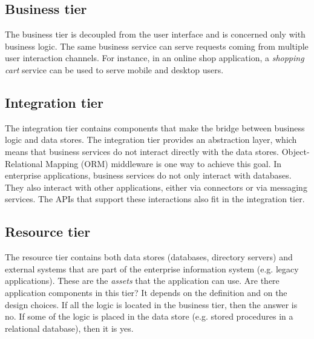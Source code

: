 \subsection{Business tier}


The business tier is decoupled from the user interface and is concerned only with business logic. The same business service can serve requests coming from multiple user interaction channels. For instance, in an online shop application, a \emph{shopping cart} service can be used to serve mobile and desktop users.

\subsection{Integration tier}


The integration tier contains components that make the bridge between business logic and data stores. The integration tier provides an abstraction layer, which means that business services do not interact directly with the data stores. Object-Relational Mapping (ORM) middleware is one way to achieve this goal. In enterprise applications, business services do not only interact with databases. They also interact with other applications, either via connectors or via messaging services. The APIs that support these interactions also fit in the integration tier.

\subsection{Resource tier}


The resource tier contains both data stores (databases, directory servers) and external systems that are part of the enterprise information system (e.g. legacy applications). These are the \emph{assets} that the application can use. Are there application components in this tier? It depends on the definition and on the design choices. If all the logic is located in the business tier, then the answer is no. If some of the logic is placed in the data store (e.g. stored procedures in a relational database), then it is yes.

